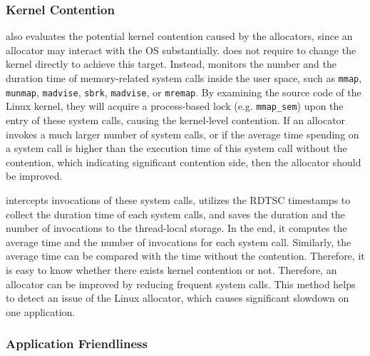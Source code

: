 

\subsubsection{Kernel Contention}
\MP{} also evaluates the potential kernel contention caused by the allocators, since an allocator may interact with the OS substantially. \MP{} does not require to change the kernel directly to achieve this target. Instead, \MP{} monitors the number and the duration time of memory-related system calls inside the user space, such as \texttt{mmap}, \texttt{munmap}, \texttt{madvise}, \texttt{sbrk}, \texttt{madvise}, or \texttt{mremap}. By examining the source code of the Linux kernel, they will acquire a process-based lock (e.g. \texttt{mmap\_sem}) upon the entry of these system calls, causing the kernel-level contention. If an allocator invokes a much larger number of system calls, or if the average time spending on a system call is higher than the execution time of this system call without the contention, which indicating significant contention side, then the allocator should be improved. 

\MP{} intercepts invocations of these system calls, utilizes the RDTSC timestamps to collect the duration time of each system calls, and saves the duration and the number of invocations to the thread-local storage. In the end, it computes the average time and the number of invocations for each system call. Similarly, the average time can be compared with the time without the contention. Therefore, it is easy to know whether there exists kernel contention or not. Therefore, an allocator can be improved by reducing frequent system calls. This method helps to detect an issue of the Linux allocator, which causes significant slowdown on one application. 

 


\subsubsection{Application Friendliness}
\label{sec: friendliness}

